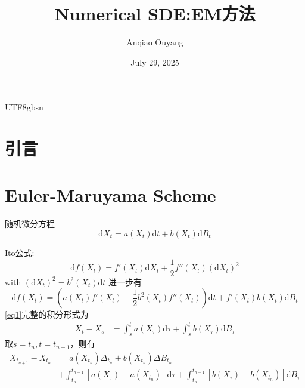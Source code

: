 \documentclass{article}
\title{Numerical SDE:EM方法}
\author{Anqiao Ouyang}
\date{July 29, 2025}
\begin{document}
\begin{CJK*}{UTF8}{gbsn}

\maketitle

\section{引言}

\section{Euler-Maruyama Scheme}
随机微分方程
\begin{equation}
    \mathrm{d}X_t=a(X_t)\mathrm{d}t+b(X_t)\mathrm{d}B_t\label{eq1}
\end{equation}

Ito公式:
\begin{equation}
    \mathrm{d}f(X_t)=f'(X_t)\mathrm{d}X_t+\frac{1}{2}f''(X_t)(\mathrm{d}X_t)^2
\end{equation}
with $(\mathrm{d}X_t)^2=b^2(X_t)\mathrm{d}t$
进一步有
\begin{equation}
    \mathrm{d}f(X_t)=\left(a(X_t)f'(X_t)+\frac{1}{2}b^2(X_t)f''(X_t)\right)\mathrm{d}t+f'(X_t)b(X_t)\mathrm{d}B_t
\label{eq2}\end{equation}
\ref{eq1}完整的积分形式为
\begin{equation}
    \begin{aligned}
    X_t-X_s
    &=\int_s^t a(X_\tau)\mathrm{d}\tau+\int_s^tb(X_\tau)\mathrm{d}B_\tau
    \end{aligned}
\end{equation}
取$s=t_{n},t=t_{n+1}$，则有
\begin{equation}
    \begin{aligned}
        X_{t_{n+1}}-X_{t_n}
        &=a(X_{t_n})\Delta_{t_n}+b(X_{t_{n}})\Delta B_{t_n}\\
        &+\int_{t_{n}}^{t_{n+1}}[a(X_\tau)-a(X_{t_{n}})]\mathrm{d}\tau
        +\int_{t_{n}}^{t_{n+1}}[b(X_\tau)-b(X_{t_{n}})]\mathrm{d}B_\tau
    \end{aligned}\label{eq3}
\end{equation}


\end{CJK*}
\end{document}
